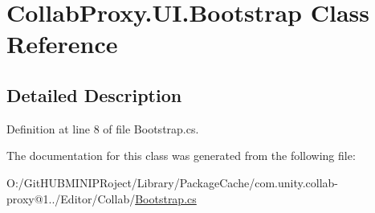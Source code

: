 \hypertarget{class_collab_proxy_1_1_u_i_1_1_bootstrap}{}\section{Collab\+Proxy.\+U\+I.\+Bootstrap Class Reference}
\label{class_collab_proxy_1_1_u_i_1_1_bootstrap}


\subsection{Detailed Description}


Definition at line 8 of file Bootstrap.\+cs.



The documentation for this class was generated from the following file\+:\begin{DoxyCompactItemize}
\item 
O\+:/\+Git\+H\+U\+B\+M\+I\+N\+I\+P\+Roject/\+Library/\+Package\+Cache/com.\+unity.\+collab-\/proxy@1../\+Editor/\+Collab/\mbox{\hyperlink{_bootstrap_8cs}{Bootstrap.\+cs}}\end{DoxyCompactItemize}
